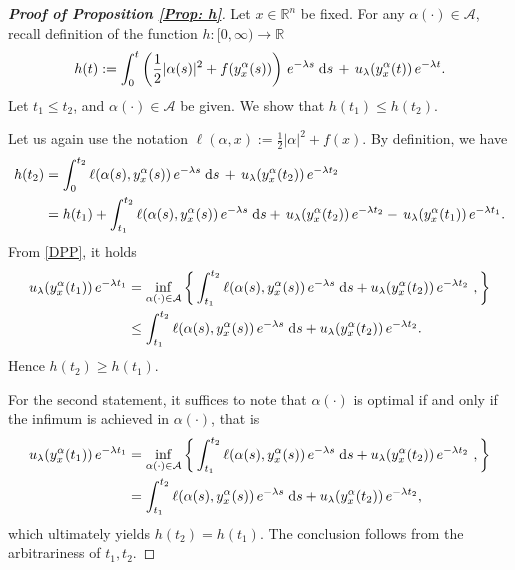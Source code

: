 \documentclass[12pt]{amsart}
\newcommand{\D}[1]{\mbox{\rm #1}}
\newcommand{\dd}{\D{d}}
\numberwithin{equation}{section}
\theoremstyle{plain}
\begin{document}

\begin{proof}[\textbf{Proof of Proposition \ref{Prop: h}}]
Let $x\in \mathbb{R}^{n}$ be fixed. For any $\alpha(\cdot)\in\mathcal{A}$, recall definition of the function $h:[0,\infty)\to \mathbb{R}$ 
\begin{equation*}
    h(t) := \int_{0}^{t} \left(\frac{1}{2}|\alpha(s)|^{2} + f(y_{x}^{\alpha}(s))\right)\, e^{-\lambda s}\;\dd s \, + \, u_{\lambda}(y_{x}^{\alpha}(t))\,e^{-\lambda t}.
\end{equation*}
Let $t_{1}\leq t_{2}$, and $\alpha(\cdot)\in\mathcal{A}$ be given. We show that $h(t_{1})\leq h(t_{2})$. 

Let us again use the notation $\ell(\alpha,x) := \frac{1}{2}|\alpha|^{2} + f(x)$. By definition, we have
\begin{equation*}
\begin{aligned}
    h(t_{2}) 
    & = \int_{0}^{t_{2}} \ell(\alpha(s),y_{x}^{\alpha}(s))\, e^{-\lambda s}\;\dd s \, + \, u_{\lambda}(y_{x}^{\alpha}(t_{2}))\,e^{-\lambda t_{2}}\\
    & = h(t_{1}) + \int_{t_{1}}^{t_{2}}  \ell(\alpha(s),y_{x}^{\alpha}(s))\, e^{-\lambda s}\;\dd s + \, u_{\lambda}(y_{x}^{\alpha}(t_{2}))\,e^{-\lambda t_{2}} - \, u_{\lambda}(y_{x}^{\alpha}(t_{1}))\,e^{-\lambda t_{1}}.
\end{aligned}
\end{equation*}
From \eqref{DPP}, it holds
\begin{equation*}
\begin{aligned}
    u_{\lambda}(y_{x}^{\alpha}(t_{1}))\,e^{-\lambda t_{1}}
    & = \inf\limits_{\alpha(\cdot)\in \mathcal{A}} \left\{ \,\int_{t_{1}}^{t_{2}}  \ell(\alpha(s),y_{x}^{\alpha}(s))\, e^{-\lambda s}\;\dd s + u_{\lambda}(y_{x}^{\alpha}(t_{2}))\,e^{-\lambda t_{2}}\ ,\right\}\\
     & \leq \int_{t_{1}}^{t_{2}}  \ell(\alpha(s),y_{x}^{\alpha}(s))\, e^{-\lambda s}\;\dd s + u_{\lambda}(y_{x}^{\alpha}(t_{2}))\,e^{-\lambda t_{2}}.
\end{aligned}
\end{equation*}
Hence $h(t_{2})\geq h(t_{1})$. 

For the second statement, it suffices to note that $\alpha(\cdot)$ is optimal if and only if the infimum is achieved in $\alpha(\cdot)$, that is
\begin{equation*}
\begin{aligned}
    u_{\lambda}(y_{x}^{\alpha}(t_{1}))\,e^{-\lambda t_{1}}
    & = \inf\limits_{\alpha(\cdot)\in \mathcal{A}} \left\{ \,\int_{t_{1}}^{t_{2}}  \ell(\alpha(s),y_{x}^{\alpha}(s))\, e^{-\lambda s}\;\dd s + u_{\lambda}(y_{x}^{\alpha}(t_{2}))\,e^{-\lambda t_{2}}\ ,\right\}\\
     & = \int_{t_{1}}^{t_{2}}  \ell(\alpha(s),y_{x}^{\alpha}(s))\, e^{-\lambda s}\;\dd s + u_{\lambda}(y_{x}^{\alpha}(t_{2}))\,e^{-\lambda t_{2}},
\end{aligned}
\end{equation*}
which ultimately yields $h(t_{2})=h(t_{1})$. The conclusion follows from the arbitrariness of $t_{1},t_{2}$.
\end{proof}
\end{document}
